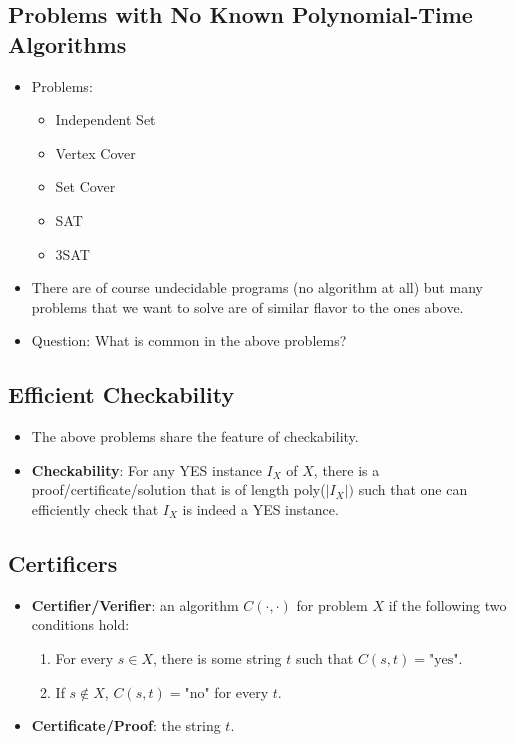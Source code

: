 \subsection{Problems with No Known Polynomial-Time Algorithms}
\begin{itemize}
    \item Problems:
    \begin{itemize}
        \item Independent Set
        \item Vertex Cover
        \item Set Cover
        \item SAT
        \item 3SAT
    \end{itemize}
    \item There are of course undecidable programs (no algorithm at all) but many problems that we want to solve are of similar flavor to the ones above.
    \item Question: What is common in the above problems?
\end{itemize}

\subsection{Efficient Checkability}
\begin{itemize}
    \item The above problems share the feature of checkability.
    \item \textbf{Checkability}: For any YES instance $I_X$ of $X$, there is a proof/certificate/solution that is of length poly($\left| I_X \right|)$ such that one can efficiently check that $I_X$ is indeed a YES instance.
\end{itemize}

\subsection{Certificers}
\begin{itemize}
    \item \textbf{Certifier/Verifier}: an algorithm $C(\cdot, \cdot)$ for problem $X$ if the following two conditions hold:
    \begin{enumerate}
        \item For every $s \in  X$, there is some string $t$ such that $C(s, t) = \text{"yes"}$.
        \item If $s \notin X$, $C(s, t) = \text{"no"}$ for every $t$.
    \end{enumerate}
    \item \textbf{Certificate/Proof}: the string $t$.
\end{itemize}

